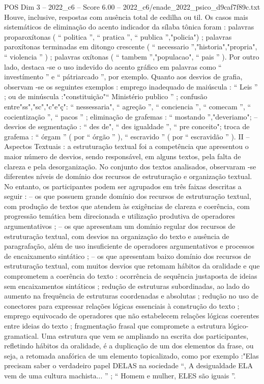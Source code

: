 \begin{textsample}{POS Dim 3 – 2022\_c6 – Score 6.00 – 2022\_c6/enade\_2022\_psico\_d9caf7f89c.txt}
Houve, inclusive, respostas com ausência total de cedilha ou til.
Os casos mais sistemáticos de eliminação do acento indicador da sílaba tônica foram : palavras proparoxítonas ( “ politica ”, “ pratica ”, “ publica ”,"policia") ; palavras paroxítonas terminadas em ditongo crescente ( “ necessario ”,"historia","propria", “ violencia ” ) ; palavras oxítonas ( “ tambem ”,"populacao", “ pais ” ).
Por outro lado, destaca -se o uso indevido do acento gráfico em palavras como “ investímento ” e “ pátriarcado ”, por exemplo.
Quanto aos desvios de grafia, observam -se os seguintes exemplos : emprego inadequado de maiúscula : “ Leis ” ; ou de minúscula :"constituição"“ Ministério publico ” ; confusão entre"ss","sc","c"e"ç": “ nessessaria", “ agreção ”, “ conciencia ”, “ comecam ”, “ cocientização ”, “ pacos ” ; eliminação de grafemas : “ mostando ”,"deveriamo"; – desvios de segmentação : “ des de", “ des igualdade ”, “ pre conceito"; troca de grafema : “ órgam ” ( por “ órgão ” ), “ escravido ” ( por “ escravidão ” ).
II – Aspectos Textuais : a estruturação textual foi a competência que apresentou o maior número de desvios, sendo responsável, em alguns textos, pela falta de clareza e pela desorganização.
No conjunto dos textos analisados, observaram -se diferentes níveis de domínio dos recursos de estruturação e organização textual.
No entanto, os participantes podem ser agrupados em três faixas descritas a seguir : – os que possuem grande domínio dos recursos de estruturação textual, com produção de textos que atendem às exigências de clareza e coerência, com progressão temática bem direcionada e utilização produtiva de operadores argumentativos ; – os que apresentam um domínio regular dos recursos de estruturação textual, com desvios na organização do texto e ausência de paragrafação, além de uso insuficiente de operadores argumentativos e processos de encaixamento sintático ; – os que apresentam baixo domínio dos recursos de estruturação textual, com muitos desvios que retomam hábitos da oralidade e que comprometem a coerência do texto : ocorrência de sequência justaposta de ideias sem encaixamentos sintáticos ; redução de estruturas subordinadas, ao lado do aumento na frequência de estruturas coordenadas e absolutas ; redução no uso de conectores para expressar relações lógicas essenciais à construção do texto ; emprego equivocado de operadores que não estabelecem relações lógicas coerentes entre ideias do texto ; fragmentação frasal que compromete a estrutura lógico-gramatical.
Uma estrutura que vem se ampliando na escrita dos participantes, refletindo hábitos da oralidade, é a duplicação de um dos elementos da frase, ou seja, a retomada anafórica de um elemento topicalizado, como por exemplo :"Elas precisam saber o verdadeiro papel DELAS na sociedade “, A desigualdade ELA vem de uma cultura machista... ” ; “ Homem e mulher, ELES são iguais ”.

\end{textsample}
